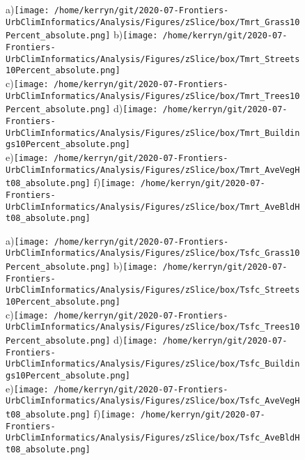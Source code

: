 \documentclass{article}
\begin{document}
\begin{figure}
\centering    
{\tiny a)}\texttt{[image: /home/kerryn/git/2020-07-Frontiers-UrbClimInformatics/Analysis/Figures/zSlice/box/Tmrt\_Grass10Percent\_absolute.png]}
{\tiny b)}\texttt{[image: /home/kerryn/git/2020-07-Frontiers-UrbClimInformatics/Analysis/Figures/zSlice/box/Tmrt\_Streets10Percent\_absolute.png]}\\
{\tiny c)}\texttt{[image: /home/kerryn/git/2020-07-Frontiers-UrbClimInformatics/Analysis/Figures/zSlice/box/Tmrt\_Trees10Percent\_absolute.png]}
{\tiny d)}\texttt{[image: /home/kerryn/git/2020-07-Frontiers-UrbClimInformatics/Analysis/Figures/zSlice/box/Tmrt\_Buildings10Percent\_absolute.png]}\\
{\tiny e)}\texttt{[image: /home/kerryn/git/2020-07-Frontiers-UrbClimInformatics/Analysis/Figures/zSlice/box/Tmrt\_AveVegHt08\_absolute.png]}
{\tiny f)}\texttt{[image: /home/kerryn/git/2020-07-Frontiers-UrbClimInformatics/Analysis/Figures/zSlice/box/Tmrt\_AveBldHt08\_absolute.png]}
\end{figure} 
\clearpage

\begin{figure}
\centering    
{\tiny a)}\texttt{[image: /home/kerryn/git/2020-07-Frontiers-UrbClimInformatics/Analysis/Figures/zSlice/box/Tsfc\_Grass10Percent\_absolute.png]}
{\tiny b)}\texttt{[image: /home/kerryn/git/2020-07-Frontiers-UrbClimInformatics/Analysis/Figures/zSlice/box/Tsfc\_Streets10Percent\_absolute.png]}\\
{\tiny c)}\texttt{[image: /home/kerryn/git/2020-07-Frontiers-UrbClimInformatics/Analysis/Figures/zSlice/box/Tsfc\_Trees10Percent\_absolute.png]}
{\tiny d)}\texttt{[image: /home/kerryn/git/2020-07-Frontiers-UrbClimInformatics/Analysis/Figures/zSlice/box/Tsfc\_Buildings10Percent\_absolute.png]}\\
{\tiny e)}\texttt{[image: /home/kerryn/git/2020-07-Frontiers-UrbClimInformatics/Analysis/Figures/zSlice/box/Tsfc\_AveVegHt08\_absolute.png]}
{\tiny f)}\texttt{[image: /home/kerryn/git/2020-07-Frontiers-UrbClimInformatics/Analysis/Figures/zSlice/box/Tsfc\_AveBldHt08\_absolute.png]}
\end{figure} 
\clearpage
\end{document}
